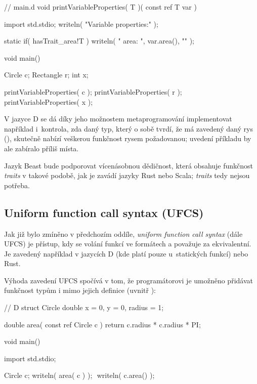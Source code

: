 \begin{itemize}
\begin{dcode}
// main.d
void printVariableProperties( T )( const ref T var ) {
	import std.stdio;
	writeln( "Variable properties:\n" );
	
	static if( hasTrait_area!T )
		writeln( "  area: ", var.area(), "\n" );
}

void main() {
	Circle c;
	Rectangle r;
	int x;
	
	printVariableProperties( c );
	printVariableProperties( r );
	printVariableProperties( x );
}
	\end{dcode}

	V jazyce D se dá díky jeho možnostem metaprogramování implementovat například i~kontrola, zda daný typ, který o sobě tvrdí, že má zavedený daný rys (), skutečně nabízí veškerou funkčnost rysem požadovanou; uvedení příkladu by ale zabíralo příliš místa.

\end{itemize}

Jazyk Beast bude podporovat vícenásobnou dědičnost, která obsahuje funkčnost \textit{traits} v takové podobě, jak je zavádí jazyky Rust nebo Scala; \textit{traits} tedy nejsou potřeba.

\subsection{Uniform function call syntax (UFCS)}
Jak již bylo zmíněno v předchozím oddíle, \textit{uniform function call syntax} (dále UFCS) je přístup, kdy se volání funkcí ve formátech  a  považuje za ekvivalentní. Je zavedený například v jazycích D (kde platí pouze u~statických funkcí) nebo Rust.

Výhoda zavedení UFCS spočívá v tom, že programátorovi je umožněno přidávat funkčnost typům i mimo jejich definice (uvnitř ):
\begin{dcode}
// D
struct Circle {
	double x = 0, y = 0, radius = 1;
}

double area( const ref Circle c ) {
	return c.radius * c.radius * PI;
}

void main() {
	import std.stdio;
	
	Circle c;
	writeln( area( c ) ); $\label{ufcs:1}$
	writeln( c.area() ); $\label{ufcs:2}$
}
\end{dcode}


